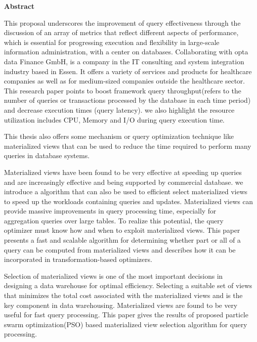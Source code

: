 \begin{center}
    \Large\textbf{Abstract}
\end{center}

\normalsize
This proposal underscores the improvement of query  effectiveness through  the  discussion of an array of metrics  that reflect different aspects of performance, which is  essential for progressing execution and flexibility in large-scale information administration, with a center on databases. Collaborating with opta data Finance GmbH, is a company in the IT consulting and system integration industry based in Essen. It offers a variety of services and products for healthcare companies as well as for medium-sized companies outside the healthcare sector. This research paper  points to boost framework query throughput(refers to the number of queries or transactions processed by the database in each time period) and decrease execution times (query latency). we also highlight the resource utilization includes CPU, Memory and I/O during query execution time.\vspace{.4cm}

This  thesis also offers some  mechanism or query optimization technique like materialized views that can be used to reduce the time required to perform many queries in database systems.\vspace{.4cm} 

Materialized views have been found to be very effective at speeding up queries and are increasingly effective and being supported by commercial database. we introduce a algorithm that can also be used to efficient select materialized views to speed up the  workloads containing queries and updates. Materialized views can provide massive improvements in query processing time, especially for aggregation queries over large tables. To realize this potential, the query optimizer must know how and when to exploit materialized views. This paper presents a fast and scalable algorithm for determining whether part or all of a query can be computed from materialized views and describes how it can be incorporated in transformation-based optimizers.\vspace{.4cm}

Selection of materialized views is one of the most important decisions in designing a data warehouse for optimal efficiency. Selecting a suitable set of views that minimizes the total cost associated with the materialized views and is the key component in data warehousing. Materialized views are found to be very useful for fast query
processing. This paper gives the results of proposed particle swarm optimization(PSO) based materialized view selection algorithm for
query processing.\vspace{.4cm}



